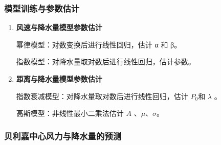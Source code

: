 \documentclass[withoutpreface,bwprint]{cumcmthesis}
\begin{document}
\subsubsection{模型训练与参数估计}

\begin{enumerate}
    \item[(1)] \textbf{风速与降水量模型参数估计}

                幂律模型：对数变换后进行线性回归，估计 α 和 β。

                指数模型：对降水量取对数后进行线性回归，估计参数。

                
    \item[(2)] \textbf{距离与降水量模型参数估计}

                指数衰减模型：对降水量取对数后进行线性回归，估计 $P_0$和 $\lambda$ 。

                高斯模型：非线性最小二乘法估计 $A$ 、$\mu$、$\sigma$。
               
\end{enumerate}

\subsubsection{贝利嘉中心风力与降水量的预测}
\end{document}
